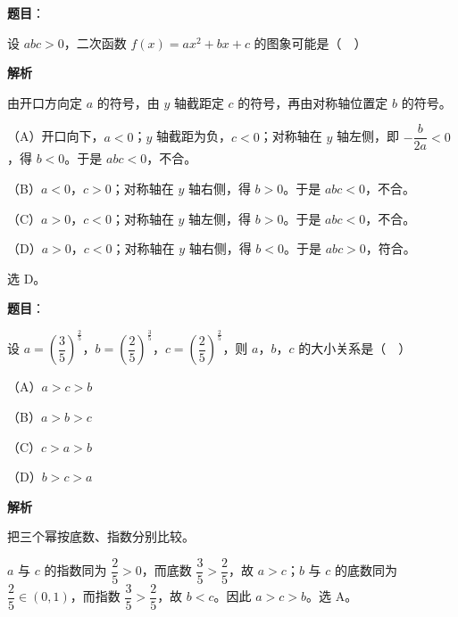 \begin{answer}

\textbf{题目}：

设 $abc>0$，二次函数 $f(x)=ax^2+bx+c$ 的图象可能是（　）
\nopagebreak[4]
\begin{center}\end{center}
\nopagebreak[4]
\textbf{解析}

由开口方向定 $a$ 的符号，由 $y$ 轴截距定 $c$ 的符号，再由对称轴位置定 $b$ 的符号。

（A）开口向下，$a<0$；$y$ 轴截距为负，$c<0$；对称轴在 $y$ 轴左侧，即 $-\dfrac b{2a}<0$，得 $b<0$。于是 $abc<0$，不合。

（B）$a<0$，$c>0$；对称轴在 $y$ 轴右侧，得 $b>0$。于是 $abc<0$，不合。

（C）$a>0$，$c<0$；对称轴在 $y$ 轴左侧，得 $b>0$。于是 $abc<0$，不合。

（D）$a>0$，$c<0$；对称轴在 $y$ 轴右侧，得 $b<0$。于是 $abc>0$，符合。

选 D。


\end{answer}
\begin{answer}

\textbf{题目}：

设 $a=\left(\dfrac35\right)^{\frac25}$，$b=\left(\dfrac25\right)^{\frac35}$，$c=\left(\dfrac25\right)^{\frac25}$，则 $a$，$b$，$c$ 的大小关系是（　）

（A）$a>c>b$

（B）$a>b>c$

（C）$c>a>b$

（D）$b>c>a$

\textbf{解析}

把三个幂按底数、指数分别比较。

$a$ 与 $c$ 的指数同为 $\dfrac25>0$，而底数 $\dfrac35>\dfrac25$，故 $a>c$；$b$ 与 $c$ 的底数同为 $\dfrac25\in(0,1)$，而指数 $\dfrac35>\dfrac25$，故 $b<c$。因此 $a>c>b$。选 A。


\end{answer}
